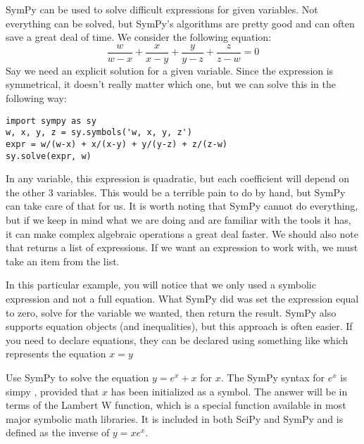 SymPy can be used to solve difficult expressions for given variables.
Not everything can be solved, but SymPy's algorithms are pretty good and can often save a great deal of time.
We consider the following equation:
\begin{equation*}
\frac{w}{w-x}+\frac{x}{x-y}+\frac{y}{y-z}+\frac{z}{z-w}=0
\end{equation*}
Say we need an explicit solution for a given variable.
Since the expression is symmetrical, it doesn't really matter which one, but we can solve this in the following way:
\begin{lstlisting}
import sympy as sy
w, x, y, z = sy.symbols('w, x, y, z')
expr = w/(w-x) + x/(x-y) + y/(y-z) + z/(z-w)
sy.solve(expr, w)
\end{lstlisting}
In any variable, this expression is quadratic, but each coefficient will depend on the other 3 variables.
This would be a terrible pain to do by hand, but SymPy can take care of that for us.
It is worth noting that SymPy cannot do everything, but if we keep in mind what we are doing and are familiar with the tools it has, it can make complex algebraic operations a great deal faster.
We should also note that  returns a list of expressions.
If we want an expression to work with, we must take an item from the list.

In this particular example, you will notice that we only used a symbolic expression and not a full equation.
What SymPy did was set the expression equal to zero, solve for the variable we wanted, then return the result.
SymPy also supports equation objects (and inequalities), but this approach is often easier.
If you need to declare equations, they can be declared using something like  which represents the equation $x=y$

\begin{problem}
Use SymPy to solve the equation $y=e^x+x$ for $x$.
The SymPy syntax for $e^x$ is simpy , provided that $x$ has been initialized as 
a symbol.
The answer will be in terms of the Lambert W function, which is a special function available in most major symbolic math libraries.
It is included in both SciPy and SymPy and is defined as the inverse of $y=x e^x$.
\end{problem}

